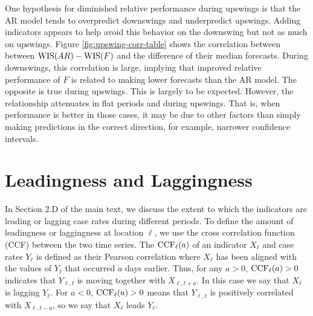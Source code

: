 One hypothesis for diminished relative performance during upswings is that the
AR model tends to overpredict downswings and underpredict upswings. Adding
indicators appears to help avoid this behavior on the downswing but not as much
on upswings. Figure \ref{fig:upswing-corr-table} shows the correlation between
between $\mathrm{WIS}(AR) - \mathrm{WIS}(F)$ and the difference of their median forecasts.
During downswings, this correlation is large, implying that improved relative
performance of $F$ is related to making lower forecasts than the AR model. The
opposite is true during upswings. This is largely to be expected. However, the
relationship attenuates in flat periods and during upswings. That is, when
performance is better in those cases, it may be due to other factors than simply
making predictions in the correct direction, for example, narrower confidence
intervals.

\section{Leadingness and Laggingness}

In Section 2.D of the main text, we discuss the extent to which the indicators
are leading or lagging case rates during different periods. To define the amount
of leadingness or laggingness at location $\ell$, we use the cross correlation
function (CCF) between the two time series. The $\mathrm{CCF}_\ell(a)$ of an indicator
$X_{\ell}$ and case rates $Y_{\ell}$ is defined as
their Pearson correlation where $X_\ell$ has been aligned with the values of
$Y_{\ell}$ that occurred $a$ days earlier.  Thus, for any $a>0$,
$\mathrm{CCF}_{\ell}(a)>0$ indicates that $Y_{\ell,t}$ is moving together with
$X_{\ell,t+a}$.  In this case we say that $X_{\ell}$ is lagging $Y_{\ell}$. For
$a<0$, $\mathrm{CCF}_{\ell}(a)>0$ means that $Y_{\ell,t}$ is positively correlated with
$X_{\ell,t-a}$, so we say that $X_{\ell}$ leads $Y_{\ell}$.

